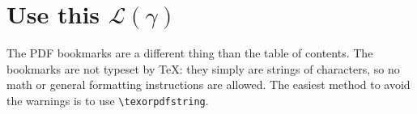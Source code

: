 
\section{Use this \texorpdfstring{$\mathcal{L}(\gamma)$}{Lg}}

The PDF bookmarks are a different thing than the table of contents. The bookmarks are not typeset by TeX: they simply are strings of characters, so no math or general formatting instructions are allowed.
The easiest method to avoid the warnings is to use \verb|\texorpdfstring|.